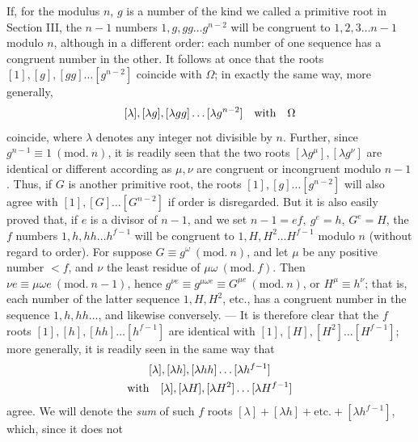 If, for the modulus \(n\), \(g\) is a number of the kind we called a primitive root in Section III, the \(n-1\) numbers \(1,\allowbreak g,\allowbreak gg\ldots g^{n-2}\) will be congruent to \(1,\allowbreak 2,\allowbreak 3\ldots n-1\) modulo \(n\), although in a different order: each number of one sequence has a congruent number in the other. It follows at once that the roots \([1],\allowbreak [g],\allowbreak [gg]\ldots[g^{n-2}]\) coincide with \(\Omega\); in exactly the same way, more generally, \[\relax[\lambda],[\lambda g],[\lambda gg]\ldots[\lambda g^{n-2}]\quad\text{with}\quad\Omega\] coincide, where \(\lambda\) denotes any integer not divisible by \(n\). Further, since \(g^{n-1}\equiv1\ (\mathrm{mod.}\ n)\), it is readily seen that the two roots \([\lambda g^\mu],\allowbreak [\lambda g^\nu]\) are identical or different according as \(\mu,\allowbreak \nu\) are congruent or incongruent modulo \(n-1\). Thus, if \(G\) is another primitive root, the roots \([1],\allowbreak [g]\ldots[g^{n-2}]\) will also agree with \([1],\allowbreak [G]\ldots[G^{n-2}]\) if order is disregarded. But it is also easily proved that, if \(e\) is a divisor of \(n-1\), and we set \(n-1=ef,\allowbreak \ g^e=h\), \(G^e=H\), the \(f\) numbers \(1,\allowbreak h,\allowbreak hh\ldots h^{f-1}\) will be congruent to \(1,\allowbreak H,\allowbreak H^2\ldots H^{f-1}\) modulo \(n\) (without regard to order). For suppose \(G\equiv g^\omega\ (\mathrm{mod.}\ n)\), and let \(\mu\) be any positive number \(<f\), and \(\nu\) the least residue of \(\mu\omega\ (\mathrm{mod.}\ f)\). Then \(\nu e\equiv\mu\omega e\ (\mathrm{mod.}\ n-1)\), hence \(g^{\nu e}\equiv g^{\mu\omega e}\equiv G^{\mu e}\ (\mathrm{mod.}\ n)\), or \(H^\mu\equiv h^\nu\); that is, each number of the latter sequence \(1,\allowbreak H,\allowbreak H^2\), etc., has a congruent number in the sequence \(1,\allowbreak h,\allowbreak hh\ldots\), and likewise conversely. — It is therefore clear that the \(f\) roots \([1],\allowbreak [h],\allowbreak [hh]\ldots[h^{f-1}]\) are identical with \([1],\allowbreak [H],\allowbreak [H^2]\ldots[H^{f-1}]\); more generally, it is readily seen in the same way that \[\begin{gathered}
\relax[\lambda],[\lambda h],[\lambda hh]\ldots[\lambda h^{f-1}]\\
\text{with}\quad[\lambda],[\lambda H],[\lambda H^2]\ldots[\lambda H^{f-1}]
\end{gathered}\] agree. We will denote the \textit{sum} of such \(f\) roots \([\lambda]+[\lambda h]+\mathrm{etc.}+[\lambda h^{f-1}]\), which, since it does not
